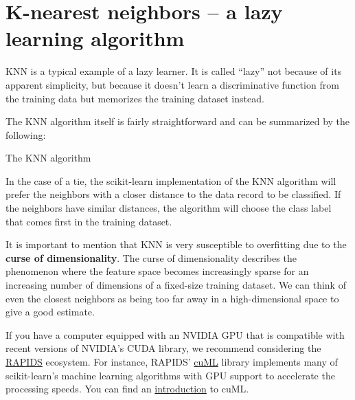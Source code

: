 \section{K-nearest neighbors – a lazy learning algorithm}
KNN is a typical example of a lazy learner. It is called “lazy” not because of its apparent simplicity, but because it doesn't learn a discriminative function from the training data but memorizes the training dataset instead.

The KNN algorithm itself is fairly straightforward and can be summarized by the following:
\begin{algorithm}
    \caption{The KNN algorithm}
\end{algorithm}

In the case of a tie, the scikit-learn implementation of the KNN algorithm will prefer the neighbors with a closer distance to the data record to be classified. If the neighbors have similar distances, the algorithm will choose the class label that comes first in the training dataset.

It is important to mention that KNN is very susceptible to overfitting due to the \textbf{curse of dimensionality}. The curse of dimensionality describes the phenomenon where the feature space becomes increasingly sparse for an increasing number of dimensions of a fixed-size training dataset. We can think of even the closest neighbors as being too far away in a high-dimensional space to give a good estimate.

\begin{tcolorbox}[title=Alternative machine learning implementations with GPU support]
    If you have a computer equipped with an NVIDIA GPU that is compatible with recent versions of NVIDIA's CUDA library, we recommend considering the \href{https://docs.rapids.ai/api}{RAPIDS} ecosystem. For instance, RAPIDS' \href{https://docs.rapids.ai/api/cuml/stable/}{cuML} library implements many of scikit-learn's machine learning algorithms with GPU support to accelerate the processing speeds. You can find an \href{https://docs.rapids.ai/api/cuml/stable/estimator_intro.html}{introduction} to cuML.
\end{tcolorbox}
